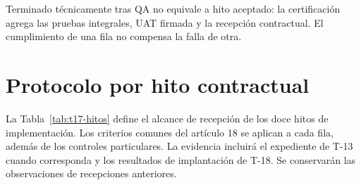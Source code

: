 Terminado técnicamente tras QA no equivale a hito aceptado: la certificación agrega las pruebas integrales, UAT firmada y la recepción contractual. El cumplimiento de una fila no compensa la falla de otra.

\section{Protocolo por hito contractual}
La Tabla~\ref{tab:t17-hitos} define el alcance de recepción de los doce hitos de implementación. Los criterios comunes del artículo 18 se aplican a cada fila, además de los controles particulares. La evidencia incluirá el expediente de T-13 cuando corresponda y los resultados de implantación de T-18. Se conservarán las observaciones de recepciones anteriores. \parencites[Formulario E-25, p.~74]{sd9-ba}[sec.~9.1--9.3]{sd9-sd9}

